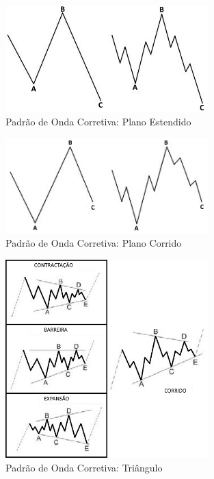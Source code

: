 \documentclass[12pt]{article}
\begin{document}
\begin{figure}[H]
	\centering
	\includegraphics[width=0.7\textwidth]{EW_pattern_08.png}
	\caption{Padrão de Onda Corretiva: Plano Estendido}\label{fig:EW_pattern_08}
\end{figure}

\begin{figure}[H]
	\centering
	\includegraphics[width=0.7\textwidth]{EW_pattern_09.png}
	\caption{Padrão de Onda Corretiva: Plano Corrido}\label{fig:EW_pattern_09}
\end{figure}

\begin{figure}[H]
	\centering
	\includegraphics[width=0.7\textwidth]{EW_pattern_10.png}
	\caption{Padrão de Onda Corretiva: Triângulo}\label{fig:EW_pattern_10}
\end{figure}
\end{document}
